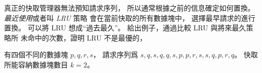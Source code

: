 \startPROBLEM
真正的快取管理器無法預知請求序列，
所以通常根據之前的信息確定如何置換。
\emph{最近使用}或者叫 \emph{LRU} 策略
會在當前快取的所有數據塊中，
選擇最早請求的進行置換。
可以將 LRU 想成“過去最久”。
給出例子，通過比較 LRU 與將來最久策略所
未命中的次數，證明 LRU 不是最優的，
\stopPROBLEM

\startANSWER
有四個不同的數據塊 $p,q,r,s$，
請求序列爲 $s,q,s,q,q,s,p,p,r,s,s,q,p,r,q$。
快取所能容納數據塊數目 $k=2$。


\stopANSWER
